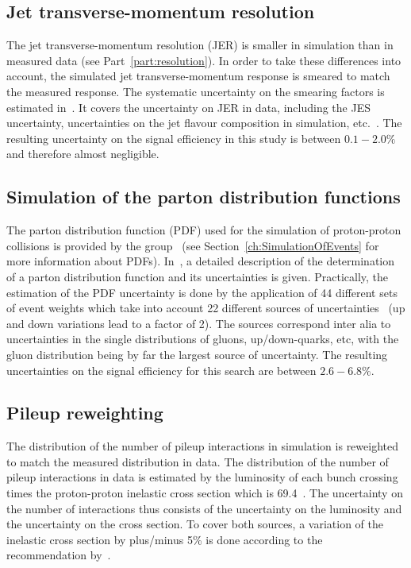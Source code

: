 \subsection*{Jet transverse-momentum resolution}
The jet transverse-momentum resolution (JER) is smaller in simulation than in measured data (see Part~\ref{part:resolution}). 
In order to take these differences into account, the simulated jet transverse-momentum response is smeared to match the measured response.
The systematic uncertainty on the smearing factors is estimated in~\cite{bib:CMS:JERCPaper_InPreparation,bib:Kristin_Thesis}.
It covers the uncertainty on JER in data, including the JES uncertainty, uncertainties on the jet flavour composition in simulation, etc.~\cite{bib:CMS:JERCPaper_2011,bib:Kristin_Thesis}.
The resulting uncertainty on the signal efficiency in this study is between $0.1-2.0\%$ and therefore almost negligible.

\subsection*{Simulation of the parton distribution functions}
The parton distribution function (PDF) used for the simulation of proton-proton collisions is provided by the \cteq group~\cite{Pumplin:2002vw} (see Section~\ref{ch:SimulationOfEvents} for more information about PDFs).
In~\cite{Pumplin:2002vw}, a detailed description of the determination of a parton distribution function and its uncertainties is given.
Practically, the estimation of the PDF uncertainty is done by the application of 44 different sets of event weights which take into account 22 different sources of uncertainties~\cite{Botje:2011sn,bib:PDF_practical} 
(up and down variations lead to a factor of 2).
The sources correspond inter alia to uncertainties in the single distributions of gluons, up/down-quarks, etc, with the gluon distribution being by far the largest source of uncertainty.
The resulting uncertainties on the signal efficiency for this search are between $2.6-6.8\%$.

\subsection*{Pileup reweighting}
The distribution of the number of pileup interactions in simulation is reweighted to match the measured distribution in data.
The distribution of the number of pileup interactions in data is estimated by the luminosity of each bunch crossing times the proton-proton inelastic cross section which is 69.4\mb~\cite{bib:CMS:PileupUtilities}.
The uncertainty on the number of interactions thus consists of the uncertainty on the luminosity and the uncertainty on the cross section.
To cover both sources, a variation of the inelastic cross section by plus/minus 5\% is done according to the recommendation by~\cite{bib:CMS:PileupSysUnc}.

